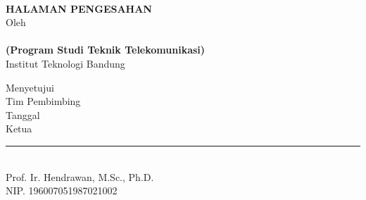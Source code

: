 \clearpage

\begin{center}    
	\renewcommand{\baselinestretch}{1}
    \large{\bfseries \MakeUppercase{\thetitle}}
    \\[2\baselineskip]

\large{\bfseries HALAMAN PENGESAHAN}
    \\[\baselineskip]

    \normalsize{Oleh\\
    	\textbf{\theauthor}\\
    	\textbf{(Program Studi Teknik Telekomunikasi)}
    	\\[\baselineskip]
    	Institut Teknologi Bandung}
    \\[3\baselineskip]
    
    
    
    
    \normalsize{Menyetujui\\
    Tim Pembimbing
    \\[\baselineskip]
    
    Tanggal \thedate\\[2\baselineskip]
    Ketua\\[4\baselineskip]
    \rule{5cm}{0.4pt} \\
    Prof. Ir. Hendrawan, M.Sc., Ph.D.\\
    NIP. 196007051987021002}

\end{center}
\clearpage

